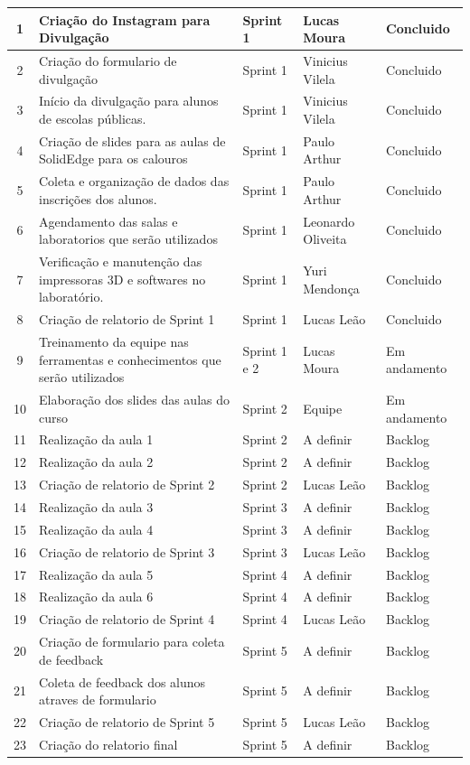 \documentclass [12 pt ,a4 paper]{article}
\begin{document}
\begin{longtable}{%
    c
    p{6.8cm}
    p{2cm}
    p{2.8cm}
    p{1.8cm}
}
1 & Criação do Instagram para Divulgação & Sprint 1 & Lucas Moura & Concluido \\
\midrule
2 & Criação do formulario de divulgação & Sprint 1 & Vinicius Vilela & Concluido \\
\midrule
3 & Início da divulgação para alunos de escolas públicas. & Sprint 1 & Vinicius Vilela & Concluido \\
\midrule
4 & Criação de slides para as aulas de SolidEdge para os calouros & Sprint 1 & Paulo Arthur & Concluido \\
\midrule
5 & Coleta e organização de dados das inscrições dos alunos. & Sprint 1 & Paulo Arthur & Concluido \\
\midrule
6 & Agendamento das salas e laboratorios que serão utilizados & Sprint 1 & Leonardo Oliveita & Concluido \\
\midrule
7 & Verificação e manutenção das impressoras 3D e softwares no laboratório. & Sprint 1 & Yuri Mendonça & Concluido \\
\midrule
8 & Criação de relatorio de Sprint 1 & Sprint 1 & Lucas Leão & Concluido \\
\midrule
9 & Treinamento da equipe nas ferramentas e conhecimentos que serão utilizados & Sprint 1 e 2 & Lucas Moura & Em andamento \\
\midrule
10 & Elaboração dos slides das aulas do curso & Sprint 2 & Equipe & Em andamento \\
\midrule
11 & Realização da aula 1 & Sprint 2 & A definir & Backlog \\
\midrule
12 & Realização da aula 2 & Sprint 2 & A definir & Backlog \\
\midrule
13 & Criação de relatorio de Sprint 2 & Sprint 2 & Lucas Leão & Backlog \\
\midrule
14 & Realização da aula 3 & Sprint 3 & A definir & Backlog \\
\midrule
15 & Realização da aula 4 & Sprint 3 & A definir & Backlog \\
\midrule
16 & Criação de relatorio de Sprint 3 & Sprint 3 & Lucas Leão & Backlog \\
\midrule
17 & Realização da aula 5 & Sprint 4 & A definir & Backlog \\
\midrule
18 & Realização da aula 6 & Sprint 4 & A definir & Backlog \\
\midrule
19 & Criação de relatorio de Sprint 4 & Sprint 4 & Lucas Leão & Backlog \\
\midrule
20 & Criação de formulario para coleta de feedback & Sprint 5 & A definir & Backlog \\
\midrule
21 & Coleta de feedback dos alunos atraves de formulario & Sprint 5 & A definir & Backlog \\
\midrule
22 & Criação de relatorio de Sprint 5 & Sprint 5 & Lucas Leão & Backlog \\
\midrule
23 & Criação do relatorio final & Sprint 5 & A definir & Backlog \\
\bottomrule
\end{longtable}
\end{document}
